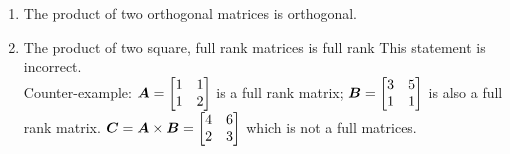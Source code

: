 \documentclass{article}
\begin{document}
\begin{enumerate}
\item The product of two orthogonal matrices is orthogonal.

\item The product of two square, full rank matrices is full rank
This statement is incorrect. \\
Counter-example:
$\boldsymbol{A}=\begin{bmatrix} 1&1\\1&2 \end{bmatrix}$ is a full rank matrix; \newline
$\boldsymbol{B}=\begin{bmatrix} 3&5\\1&1 \end{bmatrix}$ is also a full rank matrix.\newline
$\boldsymbol{C} = \boldsymbol{A}\times\boldsymbol{B} = \begin{bmatrix} 4&6\\2&3 \end{bmatrix} $ which is not a full matrices.  \newline



\end{enumerate}
\end{document}
